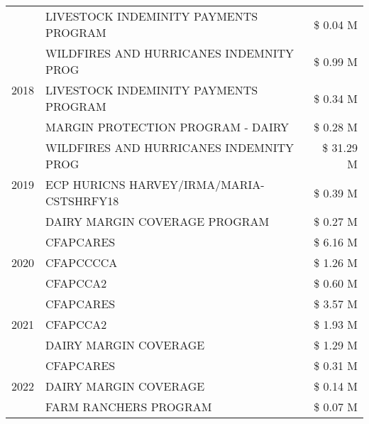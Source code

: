 \begin{tabular}{llr}
 & LIVESTOCK INDEMINITY PAYMENTS PROGRAM & \$ 0.04 M \\
\cline{1-3}
\multirow[t]{3}{*}{2018} & WILDFIRES AND HURRICANES INDEMNITY PROG & \$ 0.99 M \\
 & LIVESTOCK INDEMINITY PAYMENTS PROGRAM & \$ 0.34 M \\
 & MARGIN PROTECTION PROGRAM - DAIRY & \$ 0.28 M \\
\cline{1-3}
\multirow[t]{3}{*}{2019} & WILDFIRES AND HURRICANES INDEMNITY PROG & \$ 31.29 M \\
 & ECP HURICNS HARVEY/IRMA/MARIA-CSTSHRFY18 & \$ 0.39 M \\
 & DAIRY MARGIN COVERAGE PROGRAM & \$ 0.27 M \\
\cline{1-3}
\multirow[t]{3}{*}{2020} & CFAPCARES & \$ 6.16 M \\
 & CFAPCCCCA & \$ 1.26 M \\
 & CFAPCCA2 & \$ 0.60 M \\
\cline{1-3}
\multirow[t]{3}{*}{2021} & CFAPCARES & \$ 3.57 M \\
 & CFAPCCA2 & \$ 1.93 M \\
 & DAIRY MARGIN COVERAGE & \$ 1.29 M \\
\cline{1-3}
\multirow[t]{3}{*}{2022} & CFAPCARES & \$ 0.31 M \\
 & DAIRY MARGIN COVERAGE & \$ 0.14 M \\
 & FARM RANCHERS PROGRAM & \$ 0.07 M \\
\cline{1-3}
\bottomrule
\end{tabular}
